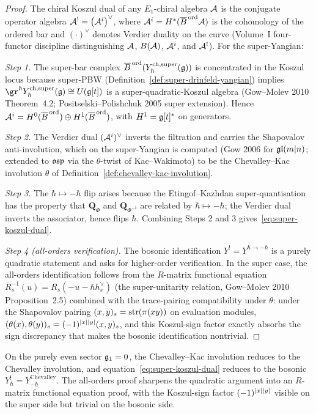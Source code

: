 \begin{proof}
The chiral Koszul dual of any $E_1$-chiral algebra $\mathcal{A}$ is the
conjugate operator algebra $\mathcal{A}^{!} = \bigl(\mathcal{A}^i\bigr)^{\vee}$, where
$\mathcal{A}^i = H^*(\overline{B}^{\,\mathrm{ord}}\mathcal{A})$ is the cohomology of the ordered bar and
$(\cdot)^\vee$ denotes Verdier duality on the curve (Volume~I
four-functor discipline distinguishing $\mathcal{A}$, $B(\mathcal{A})$, $\mathcal{A}^i$, and
$\mathcal{A}^!$). For the super-Yangian:

\emph{Step 1.} The super-bar complex $\overline{B}^{\,\mathrm{ord}}(Y^{\mathrm{ch},\mathrm{super}}_{\hbar}(\mathfrak{g}))$ is
concentrated in the Koszul locus because super-PBW
(Definition~\ref{def:super-drinfeld-yangian}) implies
$\gr^\hbar\Ysuper_{\hbar}(\fg) \cong U(\fg[t])$ is a super-quadratic-Koszul
algebra (Gow--Molev 2010 Theorem~4.2; Positselski--Polishchuk 2005 super
extension). Hence
$\mathcal{A}^i = H^0(\overline{B}^{\,\mathrm{ord}}) \oplus H^1(\overline{B}^{\,\mathrm{ord}})$, with
$H^1 = \mathfrak{g}[t]^*$ on generators.

\emph{Step 2.} The Verdier dual $(\mathcal{A}^i)^\vee$ inverts the filtration and
carries the Shapovalov anti-involution, which on the super-Yangian is
computed (Gow 2006 for $\mathfrak{gl}(m|n)$; extended to $\mathfrak{osp}$ via the
$\theta$-twist of Kac--Wakimoto) to be the Chevalley--Kac involution
$\theta$ of Definition~\ref{def:chevalley-kac-involution}.

\emph{Step 3.} The $\hbar\mapsto -\hbar$ flip arises because the
Etingof--Kazhdan super-quantisation has the property that $\mathbf{Q}_\Phi$
and $\mathbf{Q}_{\Phi^{-1}}$ are related by $\hbar\mapsto-\hbar$; the
Verdier dual inverts the associator, hence flips $\hbar$. Combining
Steps 2 and 3 gives~\eqref{eq:super-koszul-dual}.

\emph{Step 4 (all-orders verification).} The bosonic identification
$Y^! = Y^{\hbar\to-\hbar}$ is a purely quadratic statement and asks
for higher-order verification. In the super case, the all-orders
identification follows from the
$R$-matrix functional equation $R^{-1}_s(u) = R_s(-u-\hbar h^\vee_s)$
(the super-unitarity relation, Gow--Molev 2010 Proposition~2.5) combined
with the trace-pairing compatibility under $\theta$: under the
Shapovalov pairing $(x,y)_s = \operatorname{str}(\pi(xy))$ on evaluation modules,
$(\theta(x), \theta(y))_s = (-1)^{|x||y|}(x,y)_s$, and this
Koszul-sign factor exactly absorbs the sign discrepancy that makes the
bosonic identification
nontrivial.
\end{proof}

\begin{remark}
\label{rem:fm163-bosonic-recovery}
On the purely even sector $\mathfrak{g}_1=0$, the Chevalley--Kac involution
reduces to the Chevalley involution, and
equation~\eqref{eq:super-koszul-dual} reduces to
the bosonic $Y_\hbar^! = Y_{-\hbar}^{\mathrm{Chevalley}}$. The
all-orders proof sharpens the quadratic argument into an $R$-matrix
functional
equation proof, with the Koszul-sign factor $(-1)^{|x||y|}$
visible on the super side but trivial on the bosonic side.
\end{remark}


